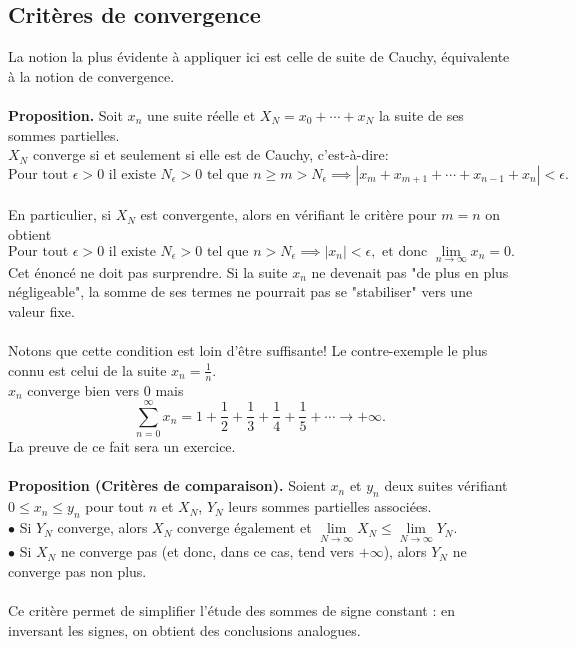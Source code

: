 \documentclass[oneside,11pt,french,table]{book}
\theoremstyle{definition}
\theoremstyle{plain}
\theoremstyle{remark}
\begin{document}
\subsection{Critères de convergence}
La notion la plus évidente à appliquer ici est celle de suite de Cauchy, équivalente à la notion de convergence. \\
\\
\textbf{Proposition.} Soit $x_n$ une suite réelle et $X_N = x_0 + \cdots + x_N$ la suite de ses sommes partielles. \\
$X_N$ converge si et seulement si elle est de Cauchy, c'est-à-dire:
$$\text{Pour tout } \epsilon > 0 \text{ il existe } N_\epsilon > 0 \text{ tel que } n \geq m > N_\epsilon \implies |x_m + x_{m+1} + \cdots + x_{n-1} + x_n| < \epsilon.$$
\pagebreak \\
En particulier, si $X_N$ est convergente, alors en vérifiant le critère pour $m =n$ on obtient
$$\text{Pour tout } \epsilon > 0 \text{ il existe } N_\epsilon > 0 \text{ tel que }n > N_\epsilon \implies |x_n| < \epsilon, \text{ et donc } \lim_{n \to \infty } x_n = 0.$$
Cet énoncé ne doit pas surprendre. Si la suite $x_n$
ne devenait pas "de plus en plus négligeable", la somme de ses termes ne pourrait pas se "stabiliser" vers une valeur fixe.
\\
\\
Notons que cette condition est loin d'être suffisante! Le contre-exemple le plus connu est celui de la suite $x_n = \frac{1}{n}$. \\
$x_n$ converge bien vers 0 mais $$\sum_{n=0}^{\infty} x_n = 1 + \dfrac{1}{2} + \dfrac{1}{3} + \dfrac{1}{4} + \dfrac{1}{5} + \cdots \longrightarrow +\infty.$$
La preuve de ce fait sera un exercice. \\ \\
\textbf{Proposition (Critères de comparaison).} Soient $x_n$ et $y_n$ deux suites vérifiant $0 \leq x_n \leq y_n$ pour tout $n$ et $X_N$, $Y_N$ leurs sommes partielles associées. \\
$\bullet$ Si $Y_N$ converge, alors $X_N$ converge également et $\lim\limits_{N \to \infty} X_N \leq \lim\limits_{N \to \infty} Y_N$. \\
$\bullet$ Si $X_N$ ne converge pas (et donc, dans ce cas, tend vers $+\infty$), alors $Y_N$ ne converge pas non plus. \\ \\
Ce critère permet de simplifier l'étude des sommes de signe constant : en inversant les signes, on obtient des conclusions analogues. \\
\end{document}
